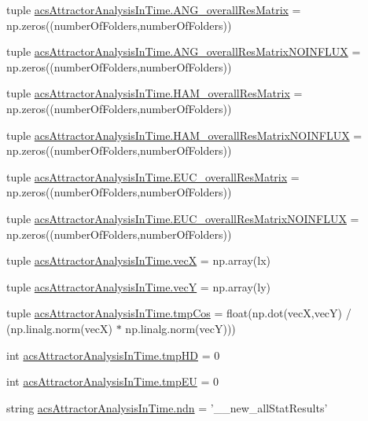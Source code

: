 \begin{DoxyCompactItemize}
\item 
tuple \hyperlink{a00123_a15adfffa273548845cea67d8b89f0bb1}{acs\-Attractor\-Analysis\-In\-Time.\-A\-N\-G\-\_\-overall\-Res\-Matrix} = np.\-zeros((number\-Of\-Folders,number\-Of\-Folders))
\item 
tuple \hyperlink{a00123_a7b0e67be0cf8de69432bdf56919d9e33}{acs\-Attractor\-Analysis\-In\-Time.\-A\-N\-G\-\_\-overall\-Res\-Matrix\-N\-O\-I\-N\-F\-L\-U\-X} = np.\-zeros((number\-Of\-Folders,number\-Of\-Folders))
\item 
tuple \hyperlink{a00123_a5e8d5d65865736555e76c3f04058ddd9}{acs\-Attractor\-Analysis\-In\-Time.\-H\-A\-M\-\_\-overall\-Res\-Matrix} = np.\-zeros((number\-Of\-Folders,number\-Of\-Folders))
\item 
tuple \hyperlink{a00123_a6ea74abf4c94200ed1b27d892ecacc97}{acs\-Attractor\-Analysis\-In\-Time.\-H\-A\-M\-\_\-overall\-Res\-Matrix\-N\-O\-I\-N\-F\-L\-U\-X} = np.\-zeros((number\-Of\-Folders,number\-Of\-Folders))
\item 
tuple \hyperlink{a00123_a63ee1925f76a40d04495e9b35c0973d2}{acs\-Attractor\-Analysis\-In\-Time.\-E\-U\-C\-\_\-overall\-Res\-Matrix} = np.\-zeros((number\-Of\-Folders,number\-Of\-Folders))
\item 
tuple \hyperlink{a00123_a4f2ecc559d2c5d79bb138a2e8ced8127}{acs\-Attractor\-Analysis\-In\-Time.\-E\-U\-C\-\_\-overall\-Res\-Matrix\-N\-O\-I\-N\-F\-L\-U\-X} = np.\-zeros((number\-Of\-Folders,number\-Of\-Folders))
\item 
tuple \hyperlink{a00123_a55e7171c96f320a08ad29f21ad5faf9a}{acs\-Attractor\-Analysis\-In\-Time.\-vec\-X} = np.\-array(lx)
\item 
tuple \hyperlink{a00123_aaa4ad55a8fe44bfc5a386dff027886b0}{acs\-Attractor\-Analysis\-In\-Time.\-vec\-Y} = np.\-array(ly)
\item 
tuple \hyperlink{a00123_a547703ec10e432928645bbe8d226dceb}{acs\-Attractor\-Analysis\-In\-Time.\-tmp\-Cos} = float(np.\-dot(vec\-X,vec\-Y) / (np.\-linalg.\-norm(vec\-X) $\ast$ np.\-linalg.\-norm(vec\-Y)))
\item 
int \hyperlink{a00123_a35b7af9eb7cd962d33c5d56eae794c7b}{acs\-Attractor\-Analysis\-In\-Time.\-tmp\-H\-D} = 0
\item 
int \hyperlink{a00123_a9019a56cfd992899ffc519204307a8ae}{acs\-Attractor\-Analysis\-In\-Time.\-tmp\-E\-U} = 0
\item 
string \hyperlink{a00123_ab0e0a55161ee1fd9fb0f086a328f67b7}{acs\-Attractor\-Analysis\-In\-Time.\-ndn} = '\-\_\-\_\-new\-\_\-all\-Stat\-Results'
\item 

\end{DoxyCompactItemize}
